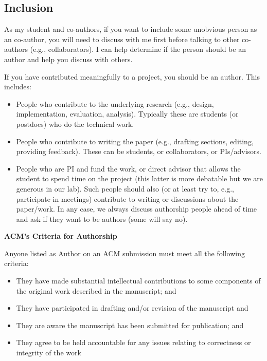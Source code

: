 \documentclass[oneside,11pt]{book}
\newenvironment{commentbox}[1][]{
  \small
  \begin{marker}[\faChessPawn{}]
    {\textbf{#1}}
  }{
  \end{marker}
}
\begin{document}
\subsection{Inclusion}  


\begin{commentbox}
  As my student and co-authors, if you want to include some unobvious person as an co-author, you will need to discuss with me first before talking to other co-authors (e.g., collaborators). I can help determine if the person should be an author and help you discuss with others.
\end{commentbox}


If you have contributed meaningfully to a project, you should be an author. This includes:

\begin{itemize}
  \item People who contribute to the underlying research (e.g., design, implementation, evaluation, analysis). Typically these are students (or postdocs) who do the technical work.
  \item People who contribute to writing the paper (e.g., drafting sections, editing, providing feedback). These can be students, or collaborators, or PIs/advisors.
  \item People who are PI and fund the work, or direct advisor that allows the student to spend time on the project (this latter is more debatable but we are generous in our lab). Such people should also (or at least try to, e.g., participate in meetings) contribute to writing or discussions about the paper/work.  In any case, we always discuss authorship people ahead of time and ask if they want to be authors (some will say no).
\end{itemize}  



\begin{commentbox}[ACM's Criteria for Authorship]
Anyone listed as Author on an ACM submission must meet all the following criteria:
\begin{itemize}
\item They have made substantial intellectual contributions to some components of the original work described in the manuscript; and
\item They have participated in drafting and/or revision of the manuscript and
\item They are aware the manuscript has been submitted for publication; and
\item They agree to be held accountable for any issues relating to correctness or integrity of the work
\end{itemize}
\end{commentbox}
\end{document}
